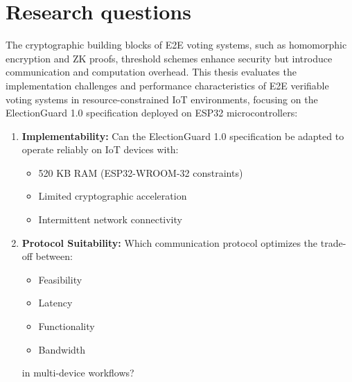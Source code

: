 \section{Research questions}
The cryptographic building blocks of \ac{E2E} voting systems, such as homomorphic encryption and \ac{ZK} proofs, threshold schemes enhance security but introduce communication and computation overhead. This thesis evaluates the implementation challenges and performance characteristics of \ac{E2E} verifiable voting systems in resource-constrained \ac{IoT} environments, focusing on the ElectionGuard 1.0 specification deployed on ESP32 microcontrollers:

\begin{enumerate}
    \item \textbf{Implementability:} Can the ElectionGuard 1.0 specification be adapted to operate reliably on IoT devices with:
    \begin{itemize}
        \item 520 KB RAM (ESP32-WROOM-32 constraints)
        \item Limited cryptographic acceleration
        \item Intermittent network connectivity
    \end{itemize}
    \item \textbf{Protocol Suitability:} Which communication protocol optimizes the trade-off between:
    \begin{itemize}
        \item Feasibility
        \item Latency
        \item Functionality
        \item Bandwidth
    \end{itemize}
    in multi-device workflows?
\end{enumerate}

